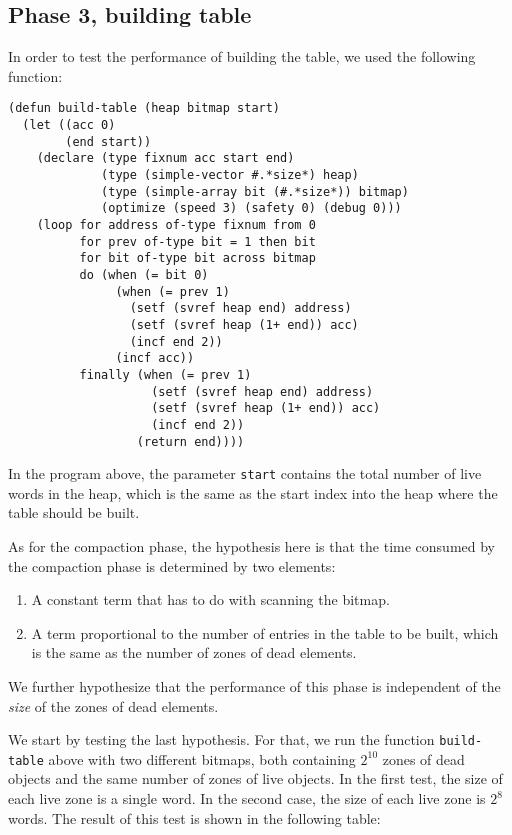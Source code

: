 \subsection{Phase 3, building table}

In order to test the performance of building the table, we used the
following function:

{\small\begin{verbatim}
(defun build-table (heap bitmap start)
  (let ((acc 0)
        (end start))
    (declare (type fixnum acc start end)
             (type (simple-vector #.*size*) heap)
             (type (simple-array bit (#.*size*)) bitmap)
             (optimize (speed 3) (safety 0) (debug 0)))
    (loop for address of-type fixnum from 0 
          for prev of-type bit = 1 then bit
          for bit of-type bit across bitmap
          do (when (= bit 0)
               (when (= prev 1)
                 (setf (svref heap end) address)
                 (setf (svref heap (1+ end)) acc)
                 (incf end 2))
               (incf acc))
          finally (when (= prev 1)
                    (setf (svref heap end) address)
                    (setf (svref heap (1+ end)) acc)
                    (incf end 2))
                  (return end))))
\end{verbatim}}

In the program above, the parameter \texttt{start} contains the total
number of live words in the heap, which is the same as the start index
into the heap where the table should be built. 

As for the compaction phase, the hypothesis here is that the time
consumed by the compaction phase is determined by two elements:

\begin{enumerate}
\item A constant term that has to do with scanning the bitmap.
\item A term proportional to the number of entries in the table to be
  built, which is the same as the number of zones of dead elements.
\end{enumerate}

We further hypothesize that the performance of this phase is
independent of the \emph{size} of the zones of dead elements. 

We start by testing the last hypothesis.  For that, we run the
function \texttt{build-table} above with two different bitmaps, both
containing $2^{10}$ zones of dead objects and the same number of zones
of live objects.  In the first test, the size of each live zone is a
single word.  In the second case, the size of each live zone is $2^8$
words.  The result of this test is shown in the following table:

